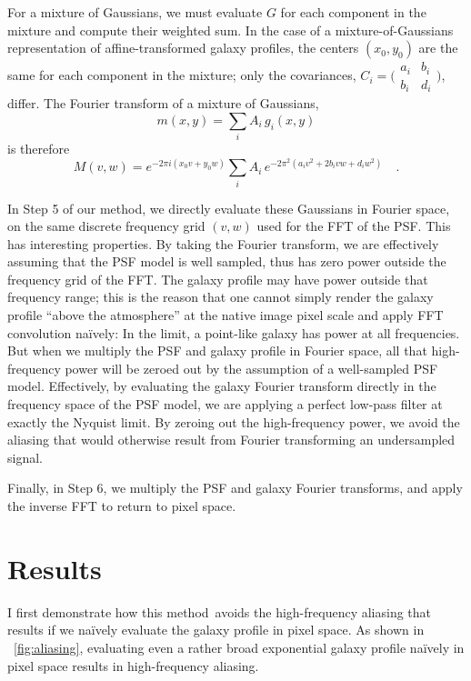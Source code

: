 \documentclass[11pt,preprint]{aastex}
\newcommand{\figref}[1]{\figurename~\ref{#1}}
\newcommand{\trick}{method}
\begin{document}
For a mixture of Gaussians, we must evaluate $G$ for each component in
the mixture and compute their weighted sum.  In the case of a
mixture-of-Gaussians representation of affine-transformed galaxy
profiles, the centers $(x_0, y_0)$ are the same for each component in
the mixture; only the covariances,
$C_i = \bigl(\begin{smallmatrix}
a_i&b_i \\ b_i&d_i
\end{smallmatrix} \bigr)$,
differ.  The Fourier transform
of a mixture of Gaussians,
\begin{equation}
m(x,y) = \sum_i A_i \, g_i(x, y)
\end{equation}
is therefore
\begin{equation}
M(v, w) = e^{-2 \pi i (x_0 v + y_0 w)}
\sum_i A_i \,
e^{-2 \pi^2 (a_i v^2 + 2 b_i v w + d_i w^2)}
\quad .
\end{equation}

In Step 5 of our \trick, we directly evaluate these Gaussians in Fourier
space, on the same discrete frequency grid $(v, w)$ used for the FFT
of the PSF.  This has interesting properties.  By taking the Fourier
transform, we are effectively assuming that the PSF model is well
sampled, thus has zero power outside the frequency grid of the FFT.
The galaxy profile may have power outside that frequency range; this
is the reason that one cannot simply render the galaxy profile ``above
the atmosphere'' at the native image pixel scale and apply FFT
convolution na\"ively: In the limit, a point-like galaxy has power at
all frequencies.  But when we multiply the PSF and galaxy profile in
Fourier space, all that high-frequency power will be zeroed out by the
assumption of a well-sampled PSF model.  Effectively, by evaluating the
galaxy Fourier transform directly in the frequency space of the PSF
model, we are applying a perfect low-pass filter at exactly the
Nyquist limit.  By zeroing out the high-frequency power, we avoid the
aliasing that would otherwise result from Fourier transforming an
undersampled signal.

Finally, in Step 6, we multiply the PSF and galaxy Fourier transforms,
and apply the inverse FFT to return to pixel space.


\section{Results}

I first demonstrate how this \trick\ avoids the high-frequency
aliasing that results if we na\"ively evaluate the galaxy profile in
pixel space.  As shown in \figref{fig:aliasing}, evaluating even a
rather broad exponential galaxy profile na\"ively in pixel space
results in high-frequency aliasing.
\end{document}
